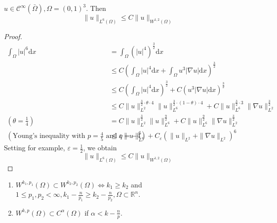 \documentclass{report}
\begin{document}
\ex{}
{
    $u \in \mathcal{C}^{\infty}(\bar{\Omega}), \Omega = (0,1)^3$. Then 
    \begin{equation}
        \|u\|_{L^{6}(\Omega)} \leq C \|u\|_{W^{1, 2}(\Omega)}
    \end{equation}
}

\begin{proof}
    \begin{align*}
        \int_{\Omega} |u|^{6} \mathrm{d}x &= \int_{\Omega} (|u|^{4})^{\frac{3}{2}} \mathrm{d}x \\
        &\leq C \left(\int_{\Omega} |u|^{4} \mathrm{d}x + \int_{\Omega} u^{3}|\nabla u| \mathrm{d}x \right)^{\frac{3}{2}} \\
        &\leq C \left(\int_{\Omega} |u|^{4} \mathrm{d}x\right)^{\frac{3}{2}} + C \left(u^{3}|\nabla u| \mathrm{d}x \right)^{\frac{3}{2}} \\
        &\leq C \|u\|^{\frac{3}{2}\cdot \theta \cdot 4}_{L^{2}} \|u\|^{\frac{3}{2}\cdot (1-\theta) \cdot 4}_{L^{6}} + C \|u\|^{\frac{3}{2}\cdot 3}_{L^{6}} \|\nabla u\|^{\frac{3}{2}}_{L^{2}} \\
        \left(\theta = \frac{1}{4}\right) &= C \|u\|^{\frac{3}{2}}_{L^{2}} \|u\|^{\frac{9}{2}}_{L^{6}} + C\|u\|^{\frac{9}{2}}_{L^{6}} \|\nabla u\|^{\frac{3}{2}}_{L^{2}} \\
        \left(\text{Young's inequality with } p=\frac{4}{5} \text{ and }q=-4\right) &\leq \varepsilon \|u\|^{6}_{L^{6}} + C_{\varepsilon}(\|u\|_{L^{2}} + \|\nabla u\|_{L^{2}})^{6}
    \end{align*}
    Setting for example, $\varepsilon = \frac{1}{2}$, we obtain
    $$\|u\|_{L^{6}(\Omega)} \leq C \|u\|_{W^{1, 2}(\Omega)}$$
\end{proof}

{
    \begin{enumerate}[label=\bfseries\tiny\protect\circled{\small\arabic*}]
		\item $W^{k_1, p_1}(\Omega) \subset W^{k_2, p_2}(\Omega) \Longleftrightarrow k_1 \geq k_2$ and $1 \leq p_1, p_2 < \infty, k_1 - \frac{n}{p_1} \geq k_2 - \frac{n}{p_2}, \Omega \subset \mathbb{R}^{n}$.
		\item $W^{k,p}(\Omega) \subset C^{\alpha}(\Omega)$ if $\alpha < k - \frac{n}{p}$.
	\end{enumerate}
}
\end{document}
